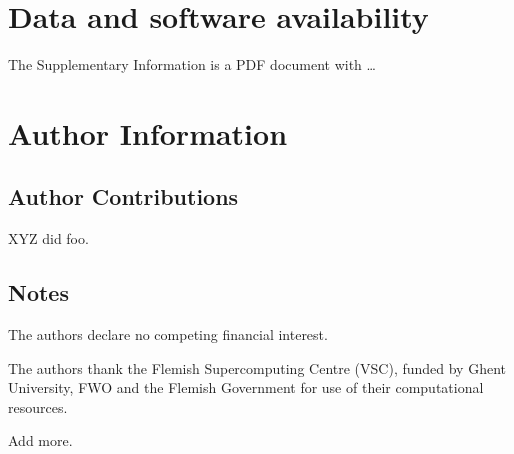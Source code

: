\documentclass[journal=jctcce,manuscript=article,layout=traditional]{achemso}
\begin{document}
    \section*{Data and software availability}
    \label{sec:availability}

    \begin{suppinfo}
    The Supplementary Information is a PDF document with \ldots
    \end{suppinfo}

    \section*{Author Information}
    \label{sec:author-information}

    \subsection*{Author Contributions}
    \label{subsec:author-contributions}

    XYZ did foo.

    \subsection*{Notes}
    \label{subsec:notes}

    The authors declare no competing financial interest.

    \begin{acknowledgement}
    The authors thank the Flemish Supercomputing Centre (VSC),
    funded by Ghent University,
    FWO and the Flemish Government for use of their computational resources.

    Add more.
    \end{acknowledgement}

    
\end{document}
